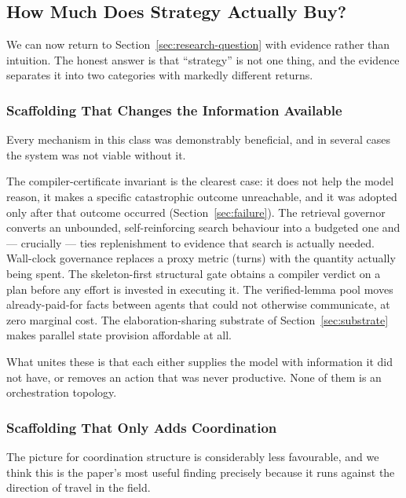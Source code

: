 \documentclass[12pt, a4paper]{article}
\begin{document}
\subsection{How Much Does Strategy Actually Buy?}
\label{sec:discussion-strategy}

We can now return to Section~\ref{sec:research-question} with evidence
rather than intuition. The honest answer is that ``strategy'' is not one
thing, and the evidence separates it into two categories with markedly
different returns.

\subsubsection{Scaffolding That Changes the Information Available}

Every mechanism in this class was demonstrably beneficial, and in several
cases the system was not viable without it.

The compiler-certificate invariant is the clearest case: it does not help
the model reason, it makes a specific catastrophic outcome unreachable, and
it was adopted only after that outcome occurred (Section~\ref{sec:failure}).
The retrieval governor converts an unbounded, self-reinforcing search
behaviour into a budgeted one and --- crucially --- ties replenishment to
evidence that search is actually needed. Wall-clock governance replaces a
proxy metric (turns) with the quantity actually being spent. The
skeleton-first structural gate obtains a compiler verdict on a plan before
any effort is invested in executing it. The verified-lemma pool moves
already-paid-for facts between agents that could not otherwise communicate,
at zero marginal cost. The elaboration-sharing substrate of
Section~\ref{sec:substrate} makes parallel state provision affordable at all.

What unites these is that each either supplies the model with information it
did not have, or removes an action that was never productive. None of them
is an orchestration topology.

\subsubsection{Scaffolding That Only Adds Coordination}

The picture for coordination structure is considerably less favourable, and
we think this is the paper's most useful finding precisely because it runs
against the direction of travel in the field.
\end{document}
